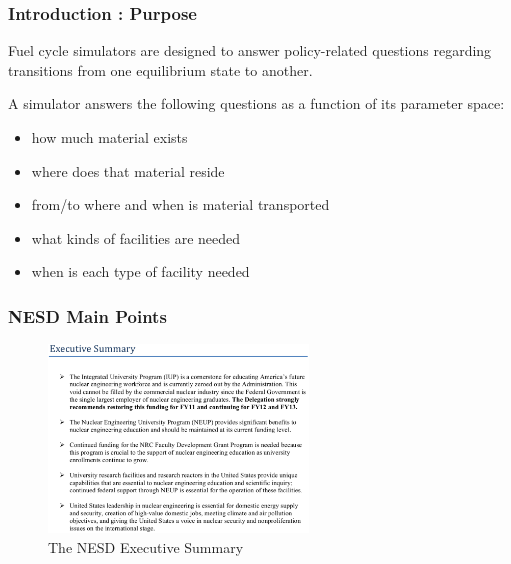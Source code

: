 
\begin{frame}[ctb!]
  \frametitle{Introduction : Purpose}
  Fuel cycle simulators are designed to answer policy-related questions
  regarding transitions from one equilibrium state to another.

  \vspace{0.2cm}

  \pause
  A simulator answers the following questions as a function of its 
  parameter space:
  \begin{itemize}
    \item how much material exists
    \item where does that material reside
    \item from/to where and when is material transported
    \item what kinds of facilities are needed
    \item when is each type of facility needed
  \end{itemize}
\end{frame}

\begin{frame}[ctb!]
  \frametitle{NESD Main Points}
  \begin{figure}[htbp!]
    \begin{center}
      \includegraphics[height=5cm]{exec.eps}
    \caption{The NESD Executive Summary}
    \label{fig:exec}
    \end{center}
  \end{figure}
\end{frame}
